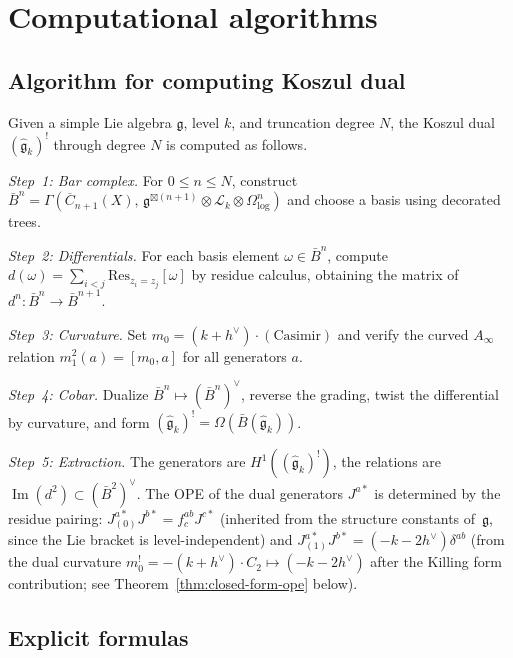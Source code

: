 \section{Computational algorithms}

\subsection{Algorithm for computing Koszul dual}

\begin{construction}\label{con:compute-km-dual}
Given a simple Lie algebra $\mathfrak{g}$, level $k$, and truncation degree $N$, the Koszul dual $(\widehat{\mathfrak{g}}_k)^!$ through degree $N$ is computed as follows.

\emph{Step~1: Bar complex.}
For $0 \le n \le N$, construct
$\bar{B}^n = \Gamma(\overline{C}_{n+1}(X),\, \mathfrak{g}^{\boxtimes(n+1)} \otimes \mathcal{L}_k \otimes \Omega^n_{\log})$
and choose a basis using decorated trees.

\emph{Step~2: Differentials.}
For each basis element $\omega \in \bar{B}^n$, compute $d(\omega) = \sum_{i<j} \mathrm{Res}_{z_i=z_j}[\omega]$ by residue calculus, obtaining the matrix of $d^n: \bar{B}^n \to \bar{B}^{n+1}$.

\emph{Step~3: Curvature.}
Set $m_0 = (k+h^\vee) \cdot (\text{Casimir})$ and verify the curved $A_\infty$ relation $m_1^2(a) = [m_0, a]$ for all generators $a$.

\emph{Step~4: Cobar.}
Dualize $\bar{B}^n \mapsto (\bar{B}^n)^\vee$, reverse the grading, twist the differential by curvature, and form $(\widehat{\mathfrak{g}}_k)^! = \Omega(\bar{B}(\widehat{\mathfrak{g}}_k))$.

\emph{Step~5: Extraction.}
The generators are $H^1((\widehat{\mathfrak{g}}_k)^!)$, the relations
are $\operatorname{Im}(d^2) \subset (\bar{B}^2)^\vee$.  The OPE of
the dual generators $J^{a*}$ is determined by the residue pairing:
$J^{a*}_{(0)} J^{b*} = f^{ab}_c J^{c*}$ (inherited from the
structure constants of~$\mathfrak{g}$, since the Lie bracket is
level-independent) and $J^{a*}_{(1)} J^{b*} = (-k - 2h^\vee)
\delta^{ab}$ (from the dual curvature $m_0^! = -(k + h^\vee)
\cdot C_2 \mapsto (-k - 2h^\vee)$ after the Killing form
contribution; see Theorem~\ref{thm:closed-form-ope} below).
\end{construction}

\subsection{Explicit formulas}

